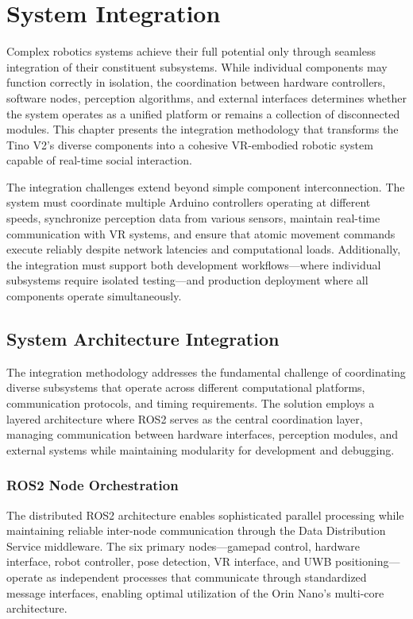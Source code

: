 \section{System Integration}
\label{sec:integration_implementation}

Complex robotics systems achieve their full potential only through seamless integration of their constituent subsystems. While individual components may function correctly in isolation, the coordination between hardware controllers, software nodes, perception algorithms, and external interfaces determines whether the system operates as a unified platform or remains a collection of disconnected modules. This chapter presents the integration methodology that transforms the Tino V2's diverse components into a cohesive VR-embodied robotic system capable of real-time social interaction.

The integration challenges extend beyond simple component interconnection. The system must coordinate multiple Arduino controllers operating at different speeds, synchronize perception data from various sensors, maintain real-time communication with VR systems, and ensure that atomic movement commands execute reliably despite network latencies and computational loads. Additionally, the integration must support both development workflows—where individual subsystems require isolated testing—and production deployment where all components operate simultaneously.

\subsection{System Architecture Integration}

The integration methodology addresses the fundamental challenge of coordinating diverse subsystems that operate across different computational platforms, communication protocols, and timing requirements. The solution employs a layered architecture where ROS2 serves as the central coordination layer, managing communication between hardware interfaces, perception modules, and external systems while maintaining modularity for development and debugging.

\subsubsection{ROS2 Node Orchestration}

The distributed ROS2 architecture enables sophisticated parallel processing while maintaining reliable inter-node communication through the Data Distribution Service middleware. The six primary nodes—gamepad control, hardware interface, robot controller, pose detection, VR interface, and UWB positioning—operate as independent processes that communicate through standardized message interfaces, enabling optimal utilization of the Orin Nano's multi-core architecture.

